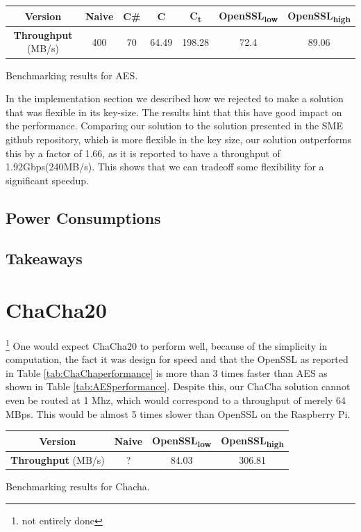 \documentclass[a4paper, openany]{book}
\begin{document}
\begin{abstact}
\begin{table}[htbp]
\centering
\begin{tabular}{|c|c|c|c|c|c|c|}
\hline
\textbf{Version} & Naive & C\# & C & C\textsubscript{t} & OpenSSL\textsubscript{low} & OpenSSL\textsubscript{high}\\
\hline
\textbf{Throughput} (MB/s) & 400 & 70 & 64.49 & 198.28 & 72.4 & 89.06\\
\hline
\end{tabular}
Benchmarking results for AES.

\end{table}
In the implementation section we described how we rejected to make a solution that was flexible in its key-size. The results hint that this have good impact on the performance. Comparing our solution to the solution presented in the SME github repository, which is more flexible in the key size, our solution outperforms this by a factor of 1.66, as it is reported to have a throughput of 1.92Gbps(240MB/s)\cite{sme}. This shows that we can tradeoff some flexibility for a significant speedup.
\subsection{Power Consumptions}
\label{sec:org95cb41d}

\subsection{Takeaways}
\label{sec:orgbd4e130}
\section{ChaCha20}
\label{sec:org3b2be97}
\footnote{not entirely done}
One would expect ChaCha20 to perform well, because of the simplicity in computation, the fact it was design for speed and that the OpenSSL as reported in Table \ref{tab:ChaChaperformance} is more than 3 times faster than AES as shown in Table \ref{tab:AESperformance}. Despite this, our ChaCha solution cannot even be routed at 1 Mhz, which would correspond to a throughput of merely 64 MBps. This would be almost 5 times slower than OpenSSL on the Raspberry Pi.
\begin{table}[htbp]
\centering
\begin{tabular}{|c|c|c|c|}
\hline
\textbf{Version} & Naive & OpenSSL\textsubscript{low} & OpenSSL\textsubscript{high}\\
\hline
\textbf{Throughput} (MB/s) & ? & 84.03 & 306.81\\
\hline
\end{tabular}
Benchmarking results for Chacha.


\end{table}
\end{abstact}
\end{document}
